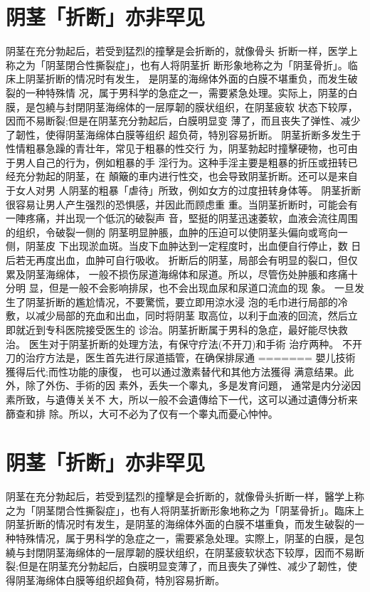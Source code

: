 \documentclass[12pt,UTF8]{ctexbook}
\begin{document}
\section{阴茎「折断」亦非罕见}
阴茎在充分勃起后，若受到猛烈的撞擊是会折断的，就像骨头
折断一样，医学上称之为「阴茎閉合性撕裂症」，也有人将阴茎折
断形象地称之为「阴茎骨折」。临床上阴茎折断的情况时有发生，
是阴茎的海绵体外面的白膜不堪重负，而发生破裂的一种特殊情
况，属于男科学的急症之一，需要紧急处理。实际上，阴茎的白
膜，是包繞与封閉阴茎海绵体的一层厚韌的膜状组织，在阴茎疲软
状态下较厚，因而不易断裂;但是在阴茎充分勃起后，白膜明显变
薄了，而且丧失了弹性、减少了韌性，使得阴茎海绵体白膜等组织
超负荷，特別容易折断。
阴茎折断多发生于性情粗暴急躁的青壮年，常见于粗暴的性交行
为，阴茎勃起时撞擊硬物，也可由于男人自己的行为，例如粗暴的手
淫行为。这种手淫主要是粗暴的折压或扭转已经充分勃起的阴茎，在
顛簸的車内进行性交，也会导致阴茎折断。还可以是来自于女人对男
人阴茎的粗暴「虐待」所致，例如女方的过度扭转身体等。
阴茎折断很容易让男人产生强烈的恐惧感，并因此而顾虑重
重。当阴茎折断时，可能会有一陣疼痛，并出现一个低沉的破裂声
音，堅挺的阴茎迅速萎软，血液会流往周围的组织，令破裂一侧的
阴茎明显肿脹，血肿的压迫可以使阴茎头偏向或弯向一侧，阴茎皮
下出现淤血斑。当皮下血肿达到一定程度时，出血便自行停止，数
日后若无再度出血，血肿可自行吸收。
折断后的阴茎，局部会有明显的裂口，但仅累及阴茎海绵体，
一般不损伤尿道海绵体和尿道。所以，尽管伤处肿脹和疼痛十分明
显，但是一般不会影响排尿，也不会出现血尿和尿道口流血的现
象。
一旦发生了阴茎折断的尷尬情况，不要驚慌，要立即用涼水浸
泡的毛巾进行局部的冷敷，以减少局部的充血和出血，同时将阴茎
取高位，以利于血液的回流，然后立即就近到专科医院接受医生的
诊治。阴茎折断属于男科的急症，最好能尽快救治。
医生对于阴茎折断的处理方法，有保守疗法(不开刀)和手術
治疗两种。
不开刀的治疗方法是，医生首先进行尿道插管，在确保排尿通
=======
嬰儿技術獲得后代;而性功能的康復，
也可以通过激素替代和其他方法獲得
满意结果。此外，除了外伤、手術的因
素外，丢失一个睾丸，多是发育问題，
通常是内分泌因素所致，与遺傳关关不
大，所以一般不会遺傳给下一代，这可以通过遺傳分析来篩查和排
除。所以，大可不必为了仅有一个睾丸而憂心忡忡。

\section{阴茎「折断」亦非罕见}

阴茎在充分勃起后，若受到猛烈的撞擊是会折断的，就像骨头折断一样，醫学上称之为「阴茎閉合性撕裂症」，也有人将阴茎折断形象地称之为「阴茎骨折」。臨床上阴茎折断的情况时有发生，是阴茎的海绵体外面的白膜不堪重負，而发生破裂的一种特殊情况，属于男科学的急症之一，需要紧急处理。实際上，阴茎的白膜，是包繞与封閉阴茎海绵体的一层厚韌的膜状组织，在阴茎疲软状态下较厚，因而不易断裂;但是在阴茎充分勃起后，白膜明显变薄了，而且喪失了弹性、减少了韌性，使得阴茎海绵体白膜等组织超負荷，特別容易折断。
\end{document}
